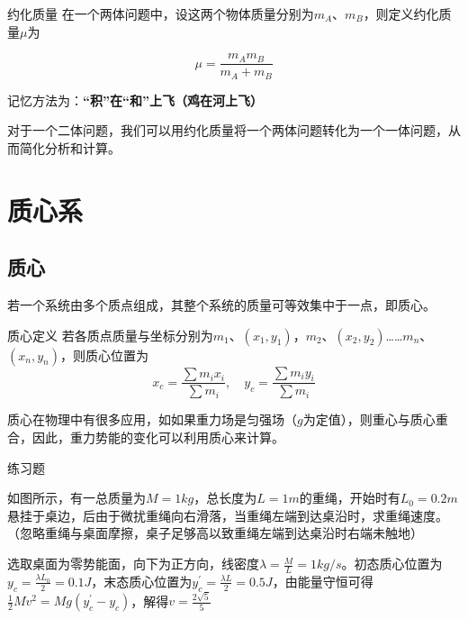 \begin{defi}{约化质量}{}
在一个两体问题中，设这两个物体质量分别为$m_A$、$m_B$，则定义约化质量$\mu$为

$$\mu = \frac{m_A m_B}{m_A + m_B}$$

记忆方法为：\textbf{“积”在“和”上飞（鸡在河上飞）}
\end{defi}

对于一个二体问题，我们可以用约化质量将一个两体问题转化为一个一体问题，从而简化分析和计算。

\section{质心系}

\subsection{质心}

若一个系统由多个质点组成，其整个系统的质量可等效集中于一点，即质心。

\begin{defi}[label=zxdy]{质心定义}{}
若各质点质量与坐标分别为$m_1$、$(x_1,y_1)$，$m_2$、$(x_2,y_2)$……$m_n$、$(x_n,y_n)$，则质心位置为
$$x_c = \frac{\sum m_i x_i}{\sum m_i} ,\quad y_c = \frac{\sum m_i y_i}{\sum m_i}$$
\end{defi}

质心在物理中有很多应用，如如果重力场是匀强场（$g$为定值），则重心与质心重合，因此，重力势能的变化可以利用质心来计算。

\begin{ep}{练习题}{}

如图所示，有一总质量为$M=1kg$，总长度为$L=1m$的重绳，开始时有$L_0 = 0.2m$悬挂于桌边，后由于微扰重绳向右滑落，当重绳左端到达桌沿时，求重绳速度。（忽略重绳与桌面摩擦，桌子足够高以致重绳左端到达桌沿时右端未触地）
~\\

\begin{minipage}[b]{0.65\linewidth}
选取桌面为零势能面，向下为正方向，线密度$\lambda = \frac{M}{L} = 1kg/s$。初态质心位置为$y_c = \frac{\lambda L_0}{2} = 0.1J$，末态质心位置为$y_c^{\prime} = \frac{\lambda L}{2} = 0.5J$，由能量守恒可得$\frac{1}{2} M v^2 = Mg(y_c^{\prime}-y_c)$，解得$v = \frac{2\sqrt{5}}{5}$
\end{minipage}
\hfill
\begin{minipage}[b]{0.35\linewidth}

\end{minipage}
\end{ep}

